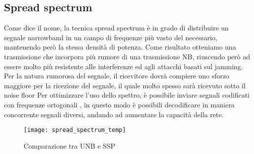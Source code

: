 \subsection{Spread spectrum} 
Come dice il nome, la tecnica spread spectrum è in grado di distribuire un
segnale narrowband in un campo di frequenze più vasto del necessario, mantenendo
però la stessa densità di potenza.
Come risultato otteniamo una trasmissione che incorpora più rumore di una
trasmissione NB, riuscendo però ad essere molto più resistente alle interferenze
ed agli attacchi basati sul jamming.
Per la natura rumorosa del segnale, il ricevitore dovrà compiere uno sforzo
maggiore per la ricezione del segnale, il quale molto spesso sarà ricevuto sotto
il noise floor 
Per ottimizzare l'uso dello spettro, è possibile inviare segnali codificati con
frequenze ortogonali , in questo modo è possibili decodificare in maniera
concorrente segnali diversi, andando ad aumentare la capacità della rete.

\begin{figure}[h]
\centering 
\texttt{[image: spread\_spectrum\_temp]}
\caption{Comparazione tra UNB e SSP}
\end{figure}

